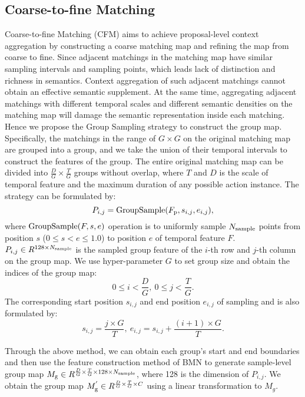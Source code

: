 \documentclass[letterpaper]{article} \usepackage{aaai22}  \usepackage{times}  \usepackage{helvet}  \usepackage{courier}  \usepackage[hyphens]{url}  \usepackage{graphicx} \urlstyle{rm} \def\UrlFont{\rm}  \usepackage{natbib}  \usepackage{caption} \DeclareCaptionStyle{ruled}{labelfont=normalfont,labelsep=colon,strut=off} \frenchspacing  \setlength{\pdfpagewidth}{8.5in}  \setlength{\pdfpageheight}{11in}  \usepackage{algorithm}
\begin{document}
\subsection{Coarse-to-fine Matching}
Coarse-to-fine Matching (CFM) aims to achieve proposal-level context aggregation by constructing a coarse matching map and refining the map from coarse to fine.
Since adjacent matchings in the matching map have similar sampling intervals and sampling points, which leads lack of distinction and richness in semantics.
Context aggregation of such adjacent matchings cannot obtain an effective semantic supplement.
At the same time, aggregating adjacent matchings with different temporal scales and different semantic densities on the matching map will damage the semantic representation inside each matching.
Hence we propose the Group Sampling strategy to construct the group map.
Specifically, the matchings in the range of $G\times G$ on the original matching map~\cite{bmn} are grouped into a group, and we take the union of their temporal intervals to construct the features of the group.
The entire original matching map can be divided into $\frac{D}{G}\times \frac{T}{G}$ groups without overlap, where $T$ and $D$ is the scale of temporal feature and the maximum duration of any possible action instance.
The strategy can be formulated by:
\begin{equation}
P_{i,j}={\rm GroupSample}(F_{\rm p},s_{i,j},e_{i,j}),
\end{equation}
where ${\rm GroupSample}(F,s,e)$ operation is to uniformly sample $N_{\rm sample}$ points from position $s$ ($0\leq s < e\leq1.0$) to position $e$ of temporal feature $F$. $P_{i,j} \in R^{128 \times N_{\rm sample}}$ is the sampled group feature of the $i$-th row and $j$-th column on the group map. We use hyper-parameter $G$ to set group size and obtain the indices of the group map:
\begin{equation}
0 \leq i < \frac{D}{G},\ 0 \leq j < \frac{T}{G}.
\end{equation}
The corresponding start position $s_{i,j}$ and end position $e_{i,j}$ of sampling and is also formulated by:
\begin{equation}
s_{i,j}=\frac{j\times G}{T},\ e_{i,j}=s_{i,j}+\frac{(i+1)\times G}{T} . 
\end{equation}

Through the above method, we can obtain each group's start and end boundaries and then use the feature construction method of BMN to generate sample-level group map $M_{\rm g} \in R^{\frac{D}{G} \times \frac{T}{G}  \times 128 \times N_{\rm sample}  }$, where 128 is the dimension of $P_{i,j}$. We obtain the group map $M_{\rm g}^{'} \in R^{ \frac{D}{G} \times \frac{T}{G} \times C}$ using a linear transformation to $M_g$.
\end{document}

